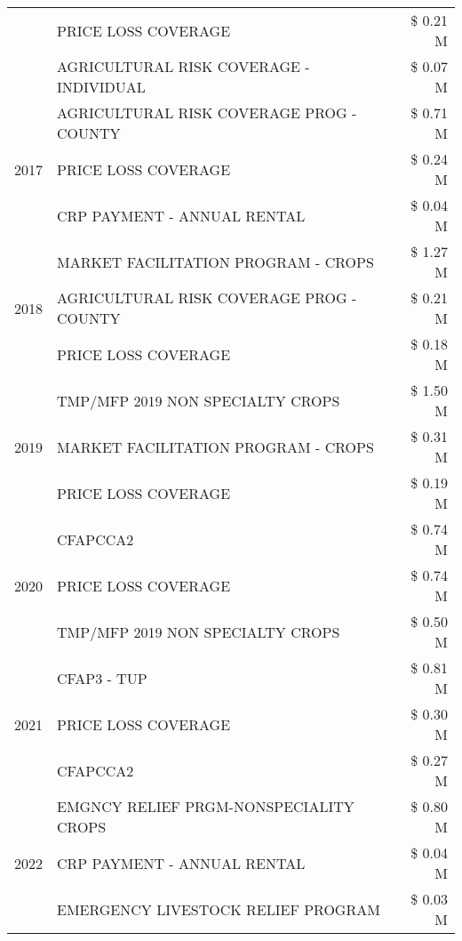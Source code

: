 \begin{tabular}{llr}
 & PRICE LOSS COVERAGE & \$ 0.21 M \\
 & AGRICULTURAL RISK COVERAGE - INDIVIDUAL & \$ 0.07 M \\
\cline{1-3}
\multirow[t]{3}{*}{2017} & AGRICULTURAL RISK COVERAGE PROG - COUNTY & \$ 0.71 M \\
 & PRICE LOSS COVERAGE & \$ 0.24 M \\
 & CRP PAYMENT - ANNUAL RENTAL & \$ 0.04 M \\
\cline{1-3}
\multirow[t]{3}{*}{2018} & MARKET FACILITATION PROGRAM - CROPS & \$ 1.27 M \\
 & AGRICULTURAL RISK COVERAGE PROG - COUNTY & \$ 0.21 M \\
 & PRICE LOSS COVERAGE & \$ 0.18 M \\
\cline{1-3}
\multirow[t]{3}{*}{2019} & TMP/MFP 2019 NON SPECIALTY CROPS & \$ 1.50 M \\
 & MARKET FACILITATION PROGRAM - CROPS & \$ 0.31 M \\
 & PRICE LOSS COVERAGE & \$ 0.19 M \\
\cline{1-3}
\multirow[t]{3}{*}{2020} & CFAPCCA2 & \$ 0.74 M \\
 & PRICE LOSS COVERAGE & \$ 0.74 M \\
 & TMP/MFP 2019 NON SPECIALTY CROPS & \$ 0.50 M \\
\cline{1-3}
\multirow[t]{3}{*}{2021} & CFAP3 - TUP & \$ 0.81 M \\
 & PRICE LOSS COVERAGE & \$ 0.30 M \\
 & CFAPCCA2 & \$ 0.27 M \\
\cline{1-3}
\multirow[t]{3}{*}{2022} & EMGNCY RELIEF PRGM-NONSPECIALITY CROPS & \$ 0.80 M \\
 & CRP PAYMENT - ANNUAL RENTAL & \$ 0.04 M \\
 & EMERGENCY LIVESTOCK RELIEF PROGRAM & \$ 0.03 M \\
\cline{1-3}
\bottomrule
\end{tabular}
